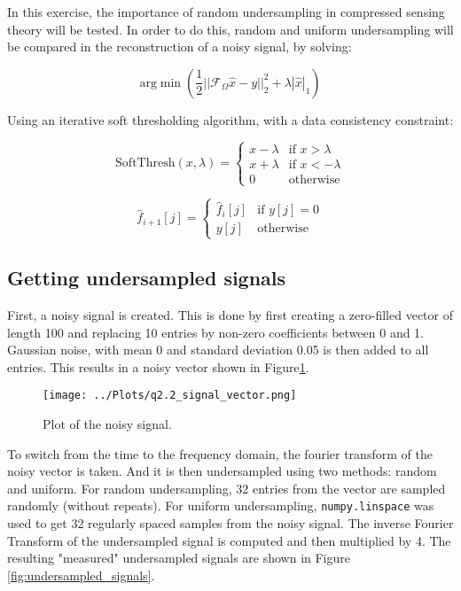 \documentclass[12pt]{report} %
\begin{document}
In this exercise, the importance of random undersampling in compressed sensing theory will be tested. In order to do this, random and uniform undersampling will be compared in the reconstruction of a noisy signal, by solving:

\begin{equation}
    \text{arg} \min{(\frac{1}{2}||\mathcal{F}_{\Omega}\hat{x} - y||^{2}_{2} + \lambda |\hat{x}|_{1})}
\end{equation}


Using an iterative soft thresholding algorithm, with a data consistency constraint:

\begin{equation}
    \text{SoftThresh}(x, \lambda) =
    \begin{cases}
        x - \lambda & \text{if } x > \lambda \\
        x + \lambda & \text{if } x < -\lambda \\
        0 & \text{otherwise}
    \end{cases}
\end{equation}

\begin{equation}
    \hat{f}_{i+1}[j] =
    \begin{cases}
        \hat{f}_{i}[j] & \text{if } y[j] = 0 \\
        y[j] & \text{otherwise}
    \end{cases}
\end{equation}

\subsection{Getting undersampled signals}

First, a noisy signal is created. This is done by first creating a zero-filled vector of length 100 and replacing 10 entries by non-zero coefficients between 0 and 1. Gaussian noise, with mean 0 and standard deviation 0.05 is then added to all entries. This results in a noisy vector shown in Figure\ref{fig:noisy_signal}.

\begin{figure}[htbp]
    \centering
    \texttt{[image: ../Plots/q2.2\_signal\_vector.png]}
    \caption{Plot of the noisy signal.}
    \label{fig:noisy_signal}
\end{figure}

To switch from the time to the frequency domain, the fourier transform of the noisy vector is taken. And it is then undersampled using two methods: random and uniform. For random undersampling, 32 entries from the vector are sampled randomly (without repeats). For uniform undersampling, \texttt{numpy.linspace} was used to get 32 regularly spaced samples from the noisy signal. The inverse Fourier Transform of the undersampled signal is computed and then multiplied by 4. The resulting "measured" undersampled signals are shown in Figure \ref{fig:undersampled_signals}.
\end{document}
